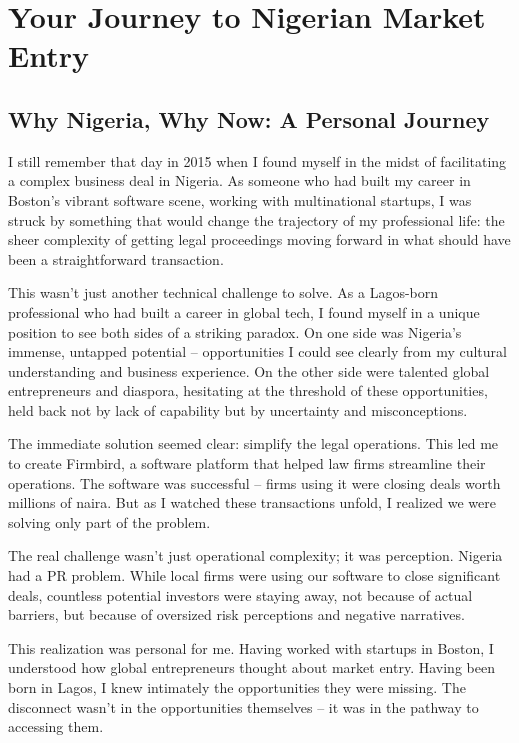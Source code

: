 \chapter*{Your Journey to Nigerian Market Entry}

\section{Why Nigeria, Why Now: A Personal Journey}\label{sec:why-nigeria-why-now:-a-personal-journey}

I still remember that day in 2015 when I found myself in the midst of facilitating a complex business deal in Nigeria. As someone who had built my career in Boston's vibrant software scene, working with multinational startups, I was struck by something that would change the trajectory of my professional life: the sheer complexity of getting legal proceedings moving forward in what should have been a straightforward transaction.

This wasn't just another technical challenge to solve. As a Lagos-born professional who had built a career in global tech, I found myself in a unique position to see both sides of a striking paradox. On one side was Nigeria's immense, untapped potential – opportunities I could see clearly from my cultural understanding and business experience. On the other side were talented global entrepreneurs and diaspora, hesitating at the threshold of these opportunities, held back not by lack of capability but by uncertainty and misconceptions.

The immediate solution seemed clear: simplify the legal operations. This led me to create Firmbird, a software platform that helped law firms streamline their operations. The software was successful – firms using it were closing deals worth millions of naira. But as I watched these transactions unfold, I realized we were solving only part of the problem.

The real challenge wasn't just operational complexity; it was perception. Nigeria had a PR problem. While local firms were using our software to close significant deals, countless potential investors were staying away, not because of actual barriers, but because of oversized risk perceptions and negative narratives.

This realization was personal for me. Having worked with startups in Boston, I understood how global entrepreneurs thought about market entry. Having been born in Lagos, I knew intimately the opportunities they were missing. The disconnect wasn't in the opportunities themselves – it was in the pathway to accessing them.

